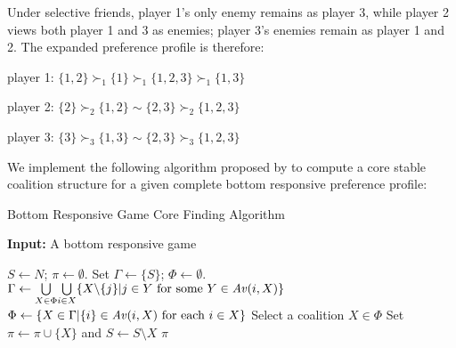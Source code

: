 Under selective friends, player 1's only enemy remains as player 3, while
player 2 views both player 1 and 3 as enemies; player 3's enemies remain as
player 1 and 2.
The expanded preference profile is therefore:

player 1: $\{1, 2\} \succ_1 \{1\} \succ_1 \{1, 2, 3\} \succ_1 \{1, 3\} $

player 2: $\{2\} \succ_2 \{1, 2\} \sim \{2, 3\} \succ_2 \{1, 2, 3\} $

player 3: $\{3\} \succ_3 \{1, 3\} \sim \{2, 3\} \succ_3 \{1, 2, 3\}$

We implement the following algorithm proposed by  to
compute a core stable coalition structure for a given complete bottom
responsive preference profile:

\begin{algorithm}[htb]
  \caption{Bottom Responsive Game Core Finding Algorithm}
  \label{alg:bottom_responsive_core}
  \textbf{Input:} A bottom responsive game
  \begin{algorithmic}[1]

  \State $S \leftarrow N$; $\pi \leftarrow \emptyset$.
    \State \label{bottom_responsive_core:select_begin} Set
      $\Gamma \leftarrow \{S\}$; $\Phi \leftarrow \emptyset$.
    \While {$\Phi = \emptyset$}
      \State $\Gamma \leftarrow \underset{X \in \Phi}{\bigcup} \underset{i \in X}{\bigcup} \{ X \text{\textbackslash} \{j\} | j \in Y \text{ for some } Y \in \mathit{Av}(i, X)\}$
      \State $\Phi \leftarrow \lbrace X \in \Gamma | \{i\} \in \mathit{Av}(i, X) \text{ for each } i \in X \rbrace$
    \EndWhile
    \State \label{bottom_responsive_core:select_end} Select a coalition
      $X \in \Phi$
    \State \label{bottom_responsive_core:reduce} Set
      $\pi \leftarrow \pi \cup \lbrace X \rbrace$ and
      $S \leftarrow  S \setminus X$
  \EndWhile
  \State \Return $\pi$

  \end{algorithmic}
\end{algorithm}

